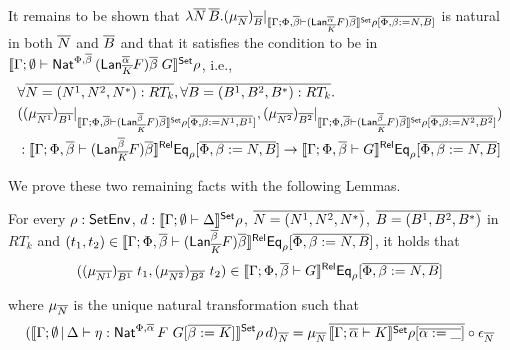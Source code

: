 \documentclass[acmsmall,review,anonymous]{acmart}
\theoremstyle{definition}
\begin{document}
    It remains to be shown that 
    $ \lambda \overline{N} \, \overline{B}. (\mu_{\overline{N}})_{\overline{B}} |_{\llbracket{\Gamma; \Phi, \overline{\beta} 
    \vdash (\mathsf{Lan}^{\overline{\alpha}}_{\overline{K}} F)\overline{\beta} }\rrbracket^{\mathsf{Set}} \rho[\overline{\Phi, \beta := N, B}]}$
    is natural in both $\overline{N}$ and $\overline{B}$
    and that it satisfies the condition to be in 
  $\llbracket{\Gamma; \emptyset \vdash 
    \mathsf{Nat}^{\Phi, \overline{\beta}}\, (\mathsf{Lan}^{\overline{\alpha}}_{\overline{K}} F)\overline{\beta}\; G}\rrbracket^{\mathsf{Set}} \rho$, 
    i.e., 
    \begin{equation}\label{eq:P2}
    \begin{split}
      &\forall \overline{N = (N^1, N^2, N^*) : RT_k}, 
          \forall \overline{B = (B^1, B^2, B^*) : RT_k}.\\
      &((\mu_{\overline{N^1}})_{\overline{B^1}}|_{\llbracket{\Gamma; \Phi, \overline{\beta} 
    \vdash (\mathsf{Lan}^{\overline{\beta}}_{\overline{K}} F)\overline{\beta} }\rrbracket^{\mathsf{Set}} \rho[\overline{\Phi, \beta := N^1, B^1}]}
      ,
      (\mu_{\overline{N^2}})_{\overline{B^2}}|_{\llbracket{\Gamma; \Phi, \overline{\beta} 
    \vdash (\mathsf{Lan}^{\overline{\beta}}_{\overline{K}} F)\overline{\beta} }\rrbracket^{\mathsf{Set}} \rho[\overline{\Phi, \beta := N^2, B^2}]}
      )\\
      &: \llbracket{\Gamma; \Phi, \overline{\beta} \vdash 
      (\mathsf{Lan}^{\overline{\beta}}_{\overline{K}} F)\overline{\beta} 
      }\rrbracket^{\mathsf{Rel}}\mathsf{Eq}_{\rho}[\overline{\Phi, \beta := N, B}]
      \rightarrow \llbracket{\Gamma; \Phi, \overline{\beta} \vdash
        G}\rrbracket^{\mathsf{Rel}}\mathsf{Eq}_{\rho}[\overline{\Phi, \beta := N, B}]
    \end{split}
    \end{equation}

    We prove these two remaining facts with the following 
    Lemmas. 

\begin{lemma}
  For every $\rho : \mathsf{SetEnv}$, $d : \llbracket{\Gamma; \emptyset \vdash \Delta}\rrbracket^{\mathsf{Set}} \rho$, 
  $\overline{N = (N^1, N^2, N^*)}$, 
          $\overline{B = (B^1, B^2, B^*)}$
  in $RT_k$ and 
  $(t_1, t_2) \in \llbracket{\Gamma; \Phi, \overline{\beta} \vdash 
        (\mathsf{Lan}^{\overline{\beta}}_{\overline{K}} F)\overline{\beta} 
        }\rrbracket^{\mathsf{Rel}}\mathsf{Eq}_{\rho}[\overline{\Phi, \beta := N, B}]$, it holds that
$$((\mu_{\overline{N^1}})_{\overline{B^1}} \,\, t_1, 
                (\mu_{\overline{N^2}})_{\overline{B^2}} \,\, t_2)
                \in \llbracket{\Gamma; \Phi, \overline{\beta} \vdash
            G}\rrbracket^{\mathsf{Rel}}\mathsf{Eq}_{\rho}[\overline{\Phi, \beta := N, B}]$$

  where $\mu_{\overline{N}}$ is the unique natural transformation such that
  $$
  (\llbracket{\Gamma; \emptyset \,|\, \Delta \vdash \eta : \mathsf{Nat}^{\Phi, \overline{\alpha}} \, F \,\, G[\overline{\beta := K}]}\rrbracket^{\mathsf{Set}}\rho \, d)_{\overline{N}}
  = \mu_{\overline{N}} \, \overline{\llbracket{\Gamma; \overline{\alpha} \vdash K}\rrbracket^{\mathsf{Set}} \rho[\overline{\alpha := \_}]} \circ 
  \epsilon_{\overline{N}}
  $$
\end{lemma}
\end{document}

